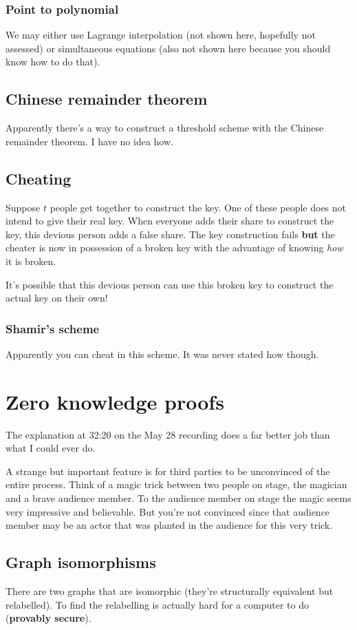 \documentclass{report}
\begin{document}
\subsection{Point to polynomial}
We may either use Lagrange interpolation
(not shown here, hopefully not assessed) or simultaneous equations (also
not shown here because you should know how to do that).

\section{Chinese remainder theorem}
Apparently there's a way to construct a threshold scheme with the
Chinese remainder theorem. I have no idea how.

\section{Cheating}
Suppose $t$ people get together to construct the key. One of these people
does not intend to give their real key. When everyone adds their share to
construct the key, this devious person adds a false share. The key construction
fails \textbf{but} the cheater is now in possession of a broken key
with the advantage of knowing \textit{how} it is broken.

It's possible that this devious person can use this broken key to construct
the actual key on their own!

\subsection{Shamir's scheme}
Apparently you can cheat in this scheme. It was never stated how though.

\chapter{Zero knowledge proofs}
The explanation at 32:20 on the May 28 recording does a far better job than
what I could ever do.

A strange but important feature is for third parties to be unconvinced of the
entire process. Think of a magic trick between two people on stage, the
magician and a brave audience member. To the audience member on stage the
magic seems very impressive and believable. But you're not convinced
since that audience member may be an actor that was planted in the audience
for this very trick.

\section{Graph isomorphisms}
There are two graphs that are isomorphic (they're structurally equivalent
but relabelled). To find the relabelling is actually hard for a computer to do
(\textbf{provably secure}).
\end{document}
